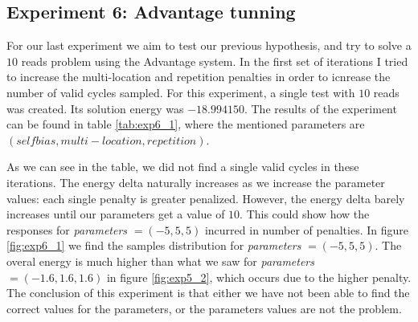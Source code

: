 \subsection{Experiment 6: Advantage tunning}


For our last experiment we aim to test our previous hypothesis, and try to solve a $10$ reads problem using the Advantage system. In the first set of iterations I tried to increase the multi-location and repetition penalties in order to icnrease the number of valid cycles sampled. For this experiment, a single test with $10$ reads was created. Its solution energy was  $-18.994150$. The results of the experiment can be found in table \ref{tab:exp6_1}, where the mentioned parameters are $(self bias, multi-location, repetition)$.

\begin{table}[H]
	\centering
	\caption{Results of experiment 6, $10.000$ reads using the quantum annealer for different parameters configurations.}
	\label{tab:exp6_1}
\end{table}

As we can see in the table, we did not find a single valid cycles in these iterations. The energy delta naturally increases as we increase the parameter values: each single penalty is greater penalized. However, the energy delta barely increases until our parameters get a value of $10$. This could show how the responses for \emph{parameters} $= (-5, 5, 5)$ incurred in number of penalties. In figure \ref{fig:exp6_1} we find the samples distribution for \emph{parameters} $= (-5, 5, 5)$. The overal energy is much higher than what we saw for \emph{parameters} $= (-1.6, 1.6, 1.6)$ in figure \ref{fig:exp5_2}, which occurs due to the higher penalty. The conclusion of this experiment is that either we have not been able to find the correct values for the parameters, or the parameters values are not the problem.

